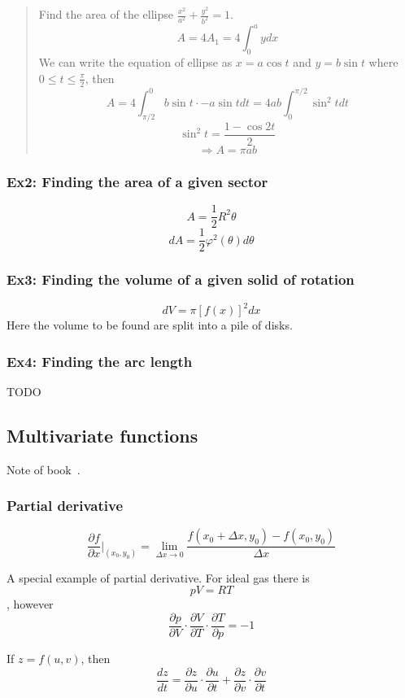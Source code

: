  \begin{quote}
 Find the area of the ellipse $\frac{x^2}{a^2}+\frac{y^2}{b^2}=1$.
 $$ A = 4A_1 = 4 \int_0^a ydx $$
 We can write the equation of ellipse as $x = a\cos t$ and $y=b\sin t$ where
 $0\leq t\leq \frac{\pi}{2}$, then
 $$ A = 4\int_{\pi/2}^0 b\sin t \cdot -a\sin t dt = 4ab \int_0^{\pi/2} \sin^2 tdt$$
 $$ \sin^2 t = \frac{1-\cos 2t}{2} $$
 $$ \Rightarrow A = \pi a b $$
 \end{quote}

 \subsubsection{Ex2: Finding the area of a given sector}

 $$ A = \frac{1}{2}R^2 \theta $$
 $$ dA = \frac{1}{2} \varphi^2(\theta) d\theta $$

 \subsubsection{Ex3: Finding the volume of a given solid of rotation}

 $$ dV = \pi [f(x)]^2 dx $$
 Here the volume to be found are split into a pile of disks.

 \subsubsection{Ex4: Finding the arc length}
 TODO

\subsection{Multivariate functions}

 Note of book~\cite{bib:calc2}.

 \subsubsection{Partial derivative}

$$ \frac{\partial f}{\partial x} |_{(x_0,y_0)} =
 \lim_{\Delta x \rightarrow 0} \frac{f(x_0+\Delta x,y_0)-f(x_0,y_0)}
 {\Delta x} $$

 A special example of partial derivative. For ideal gas there is
 $$ pV=RT $$, however
 $$ \frac{\partial p}{\partial V} \cdot
    \frac{\partial V}{\partial T} \cdot
    \frac{\partial T}{\partial p} = -1 $$

 If $z=f(u,v)$, then $$ \frac{dz}{dt} = \frac{\partial z}{\partial u}\cdot
 \frac{\partial u}{\partial t} + \frac{\partial z}{\partial v}\cdot
 \frac{\partial v}{\partial t} $$

